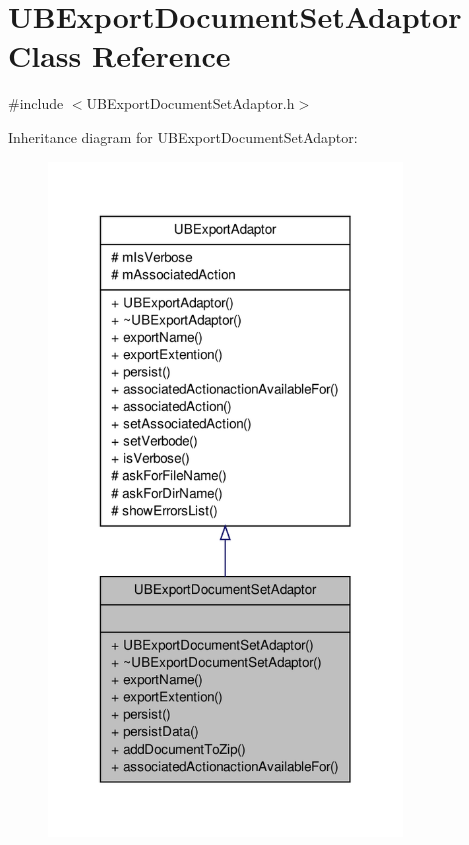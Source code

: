 \hypertarget{class_u_b_export_document_set_adaptor}{\section{U\-B\-Export\-Document\-Set\-Adaptor Class Reference}
\label{dc/d05/class_u_b_export_document_set_adaptor}
}


{\ttfamily \#include $<$U\-B\-Export\-Document\-Set\-Adaptor.\-h$>$}



Inheritance diagram for U\-B\-Export\-Document\-Set\-Adaptor\-:
\nopagebreak
\begin{figure}[H]
\begin{center}
\leavevmode
\includegraphics[width=266pt]{d2/de4/class_u_b_export_document_set_adaptor__inherit__graph}
\end{center}
\end{figure}


